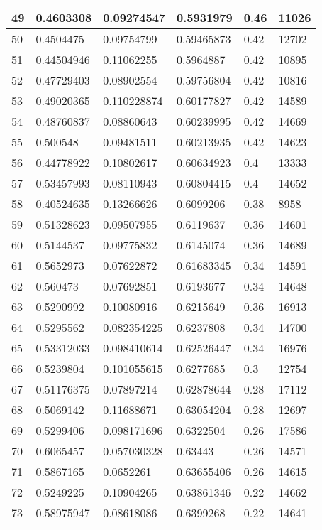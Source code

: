 \begin{longtable}{|l|l|l|l|l|l|}
49 & 0.4603308 & 0.09274547 & 0.5931979 & 0.46 & 11026 \\ \hline 
50 & 0.4504475 & 0.09754799 & 0.59465873 & 0.42 & 12702 \\ \hline 
51 & 0.44504946 & 0.11062255 & 0.5964887 & 0.42 & 10895 \\ \hline 
52 & 0.47729403 & 0.08902554 & 0.59756804 & 0.42 & 10816 \\ \hline 
53 & 0.49020365 & 0.110228874 & 0.60177827 & 0.42 & 14589 \\ \hline 
54 & 0.48760837 & 0.08860643 & 0.60239995 & 0.42 & 14669 \\ \hline 
55 & 0.500548 & 0.09481511 & 0.60213935 & 0.42 & 14623 \\ \hline 
56 & 0.44778922 & 0.10802617 & 0.60634923 & 0.4 & 13333 \\ \hline 
57 & 0.53457993 & 0.08110943 & 0.60804415 & 0.4 & 14652 \\ \hline 
58 & 0.40524635 & 0.13266626 & 0.6099206 & 0.38 & 8958 \\ \hline 
59 & 0.51328623 & 0.09507955 & 0.6119637 & 0.36 & 14601 \\ \hline 
60 & 0.5144537 & 0.09775832 & 0.6145074 & 0.36 & 14689 \\ \hline 
61 & 0.5652973 & 0.07622872 & 0.61683345 & 0.34 & 14591 \\ \hline 
62 & 0.560473 & 0.07692851 & 0.6193677 & 0.34 & 14648 \\ \hline 
63 & 0.5290992 & 0.10080916 & 0.6215649 & 0.36 & 16913 \\ \hline 
64 & 0.5295562 & 0.082354225 & 0.6237808 & 0.34 & 14700 \\ \hline 
65 & 0.53312033 & 0.098410614 & 0.62526447 & 0.34 & 16976 \\ \hline 
66 & 0.5239804 & 0.101055615 & 0.6277685 & 0.3 & 12754 \\ \hline 
67 & 0.51176375 & 0.07897214 & 0.62878644 & 0.28 & 17112 \\ \hline 
68 & 0.5069142 & 0.11688671 & 0.63054204 & 0.28 & 12697 \\ \hline 
69 & 0.5299406 & 0.098171696 & 0.6322504 & 0.26 & 17586 \\ \hline 
70 & 0.6065457 & 0.057030328 & 0.63443 & 0.26 & 14571 \\ \hline 
71 & 0.5867165 & 0.0652261 & 0.63655406 & 0.26 & 14615 \\ \hline 
72 & 0.5249225 & 0.10904265 & 0.63861346 & 0.22 & 14662 \\ \hline 
73 & 0.58975947 & 0.08618086 & 0.6399268 & 0.22 & 14641 \\ \hline 

\end{longtable}
